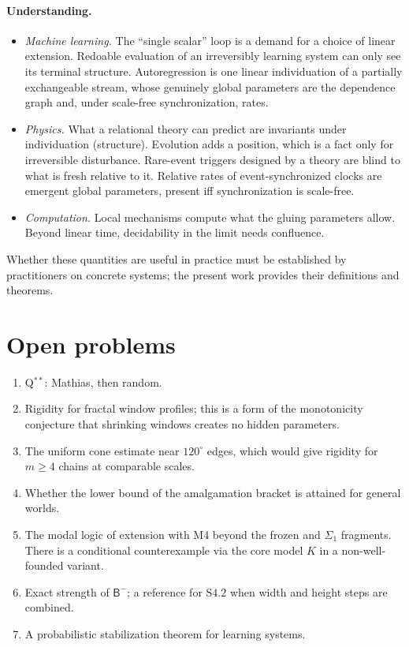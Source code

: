 \documentclass[11pt]{article}
\theoremstyle{definition}
\theoremstyle{remark}
\newcommand{\Bm}{\mathsf{B}^{-}}
\begin{document}
\paragraph{Understanding.}
\begin{itemize}
\item \emph{Machine learning.} The ``single scalar'' loop is a demand for a choice of linear extension. Redoable evaluation of an irreversibly learning system can only see its terminal structure. Autoregression is one linear individuation of a partially exchangeable stream, whose genuinely global parameters are the dependence graph and, under scale-free synchronization, rates.
\item \emph{Physics.} What a relational theory can predict are invariants under individuation (structure). Evolution adds a position, which is a fact only for irreversible disturbance. Rare-event triggers designed by a theory are blind to what is fresh relative to it. Relative rates of event-synchronized clocks are emergent global parameters, present iff synchronization is scale-free.
\item \emph{Computation.} Local mechanisms compute what the gluing parameters allow. Beyond linear time, decidability in the limit needs confluence.
\end{itemize}

\noindent Whether these quantities are useful in practice must be established by practitioners on concrete systems; the present work provides their definitions and theorems.

\section{Open problems}\label{sec:open}
\begin{enumerate}
\item Q$^{**}$: Mathias, then random.
\item Rigidity for fractal window profiles; this is a form of the monotonicity conjecture that shrinking windows creates no hidden parameters.
\item The uniform cone estimate near $120^\circ$ edges, which would give rigidity for $m\ge4$ chains at comparable scales.
\item Whether the lower bound of the amalgamation bracket is attained for general worlds.
\item The modal logic of extension with M4 beyond the frozen and $\Sigma_1$ fragments. There is a conditional counterexample via the core model $K$ in a non-well-founded variant.
\item Exact strength of $\Bm$; a reference for $\mathrm{S4.2}$ when width and height steps are combined.
\item A probabilistic stabilization theorem for learning systems.
\end{enumerate}
\end{document}
